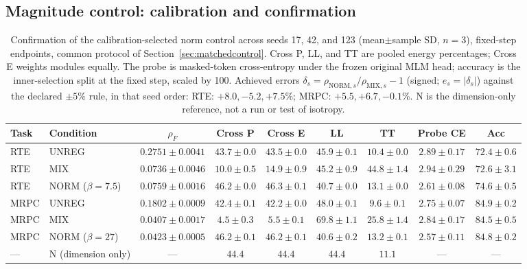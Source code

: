\documentclass{article}
\begin{document}
\subsection{Magnitude control: calibration and confirmation}
\label{app:matchedprotocol}
\begin{table}[t]
\centering
\caption{Confirmation of the calibration-selected norm control across seeds 17, 42, and 123
(mean$\pm$sample SD, $n=3$), fixed-step endpoints, common protocol of
Section~\ref{sec:matchedcontrol}. Cross P, LL, and TT are pooled energy percentages; Cross E weights modules equally.
The probe is masked-token cross-entropy under the frozen original MLM head;
accuracy is the inner-selection split at the fixed step, scaled by 100. Achieved errors
$\delta_s=\rho_{\mathrm{NORM},s}/\rho_{\mathrm{MIX},s}-1$ (signed; $e_s=|\delta_s|$) against the declared
$\pm5\%$ rule, in that seed order: RTE: $+8.0, -5.2, +7.5$\%; MRPC: $+5.5, +6.7, -0.1$\%.
N is the dimension-only reference, not a run or test of isotropy.}
\label{tab:matchedconfirmation}
\begin{adjustbox}{max width=\linewidth}
\begin{tabular}{llccccccc}
\toprule
Task & Condition & $\rho_F$ & Cross P & Cross E & LL & TT & Probe CE & Acc \\
\midrule
RTE & UNREG & $0.2751 \pm 0.0041$ & $43.7 \pm 0.0$ & $43.5 \pm 0.0$ & $45.9 \pm 0.1$ & $10.4 \pm 0.0$ & $2.89 \pm 0.17$ & $72.4 \pm 0.6$ \\
RTE & MIX & $0.0736 \pm 0.0046$ & $10.0 \pm 0.5$ & $14.9 \pm 0.9$ & $45.2 \pm 0.9$ & $44.8 \pm 1.4$ & $2.94 \pm 0.29$ & $72.6 \pm 3.1$ \\
RTE & NORM ($\beta=7.5$) & $0.0759 \pm 0.0016$ & $46.2 \pm 0.0$ & $46.3 \pm 0.1$ & $40.7 \pm 0.0$ & $13.1 \pm 0.0$ & $2.61 \pm 0.08$ & $74.6 \pm 0.5$ \\
\midrule
MRPC & UNREG & $0.1802 \pm 0.0009$ & $42.4 \pm 0.1$ & $42.2 \pm 0.0$ & $48.0 \pm 0.1$ & $9.6 \pm 0.1$ & $2.75 \pm 0.07$ & $84.9 \pm 0.2$ \\
MRPC & MIX & $0.0407 \pm 0.0017$ & $4.5 \pm 0.3$ & $5.5 \pm 0.1$ & $69.8 \pm 1.1$ & $25.8 \pm 1.4$ & $2.84 \pm 0.17$ & $84.5 \pm 0.5$ \\
MRPC & NORM ($\beta=27$) & $0.0423 \pm 0.0005$ & $46.2 \pm 0.1$ & $46.2 \pm 0.1$ & $40.6 \pm 0.2$ & $13.2 \pm 0.1$ & $2.57 \pm 0.11$ & $84.8 \pm 0.2$ \\
\midrule
--- & N (dimension only) & --- & $44.4$ & $44.4$ & $44.4$ & $11.1$ & --- & --- \\
\bottomrule
\end{tabular}
\end{adjustbox}
\end{table}
\end{document}
